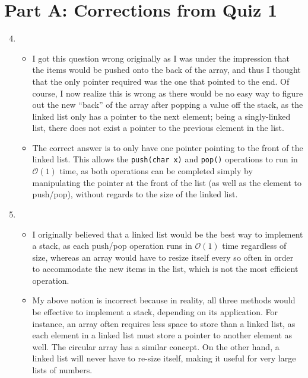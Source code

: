 \documentclass[10pt, notitlepage]{article}
\begin{document}

\section*{Part A: Corrections from Quiz 1}

\begin{enumerate}
\setcounter{enumi}{3}
\item \begin{itemize}
	\item I got this question wrong originally as I was under the impression that the items would be pushed onto the back of the array, and thus I thought that the only pointer required was the one that pointed to the end. Of course, I now realize this is wrong as there would be no easy way to figure out the new ``back'' of the array after popping a value off the stack, as the linked list only has a pointer to the next element; being a singly-linked list, there does not exist a pointer to the previous element in the list.
	\item The correct answer is to only have one pointer pointing to the front of the linked list. This allows the \texttt{push(char x)} and \texttt{pop()} operations to run in $\mathcal{O}(1)$ time, as both operations can be completed simply by manipulating the pointer at the front of the list (as well as the element to push/pop), without regards to the size of the linked list.
	\end{itemize}
\setcounter{enumi}{5}
\item \begin{itemize}
	\item I originally believed that a linked list would be the best way to implement a stack, as each push/pop operation runs in $\mathcal{O}(1)$ time regardless of size, whereas an array would have to resize itself every so often in order to accommodate the new items in the list, which is not the most efficient operation.
	\item My above notion is incorrect because in reality, all three methods would be effective to implement a stack, depending on its application. For instance, an array often requires less space to store than a linked list, as each element in a linked list must store a pointer to another element as well. The circular array has a similar concept. On the other hand, a linked list will never have to re-size itself, making it useful for very large lists of numbers.
	\end{itemize}
\end{enumerate}
\end{document}
